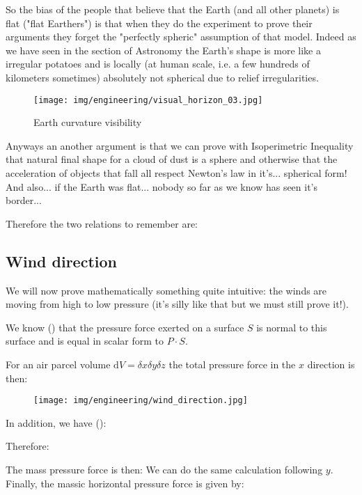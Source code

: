 	So the bias of the people that believe that the Earth (and all other planets) is flat ("flat Earthers") is that when they do the experiment to prove their arguments they forget the "perfectly spheric" assumption of that model. Indeed as we have seen in the section of Astronomy the Earth's shape is more like a irregular potatoes and is locally (at human scale, i.e. a few hundreds of kilometers sometimes) absolutely not spherical due to relief irregularities.
	\begin{figure}[H]
		\begin{center}
			\texttt{[image: img/engineering/visual\_horizon\_03.jpg]}
			\caption{Earth curvature visibility}
		\end{center}	
	\end{figure}
	Anyways an another argument is that we can prove with Isoperimetric Inequality that natural final shape for a cloud of dust is a sphere and otherwise that the acceleration of objects that fall all respect Newton's law in it's... spherical form! And also... if the Earth was flat... nobody so far as we know has seen it's border...
	
	Therefore the two relations to remember are:
	
	
	\pagebreak
	\subsection{Wind direction}
	We will now prove mathematically something quite intuitive: the winds are moving from high to low pressure (it's silly like that but we must still prove it!).

	We know () that the pressure force exerted on a surface $S$ is normal to this surface and is equal in scalar form to $P\cdot S$.
	
	For an air parcel volume $\mathrm{d}V=\delta x\delta y\delta z$ the total pressure force in the $x$ direction is then:
	
	\begin{figure}[H]
		\begin{center}
		\texttt{[image: img/engineering/wind\_direction.jpg]}
		\end{center}	
	\end{figure}
	In addition, we have ():
	
	Therefore:
	
	The mass pressure force is then:
	We can do the same calculation following $y$. Finally, the massic horizontal pressure force is given by:
	
